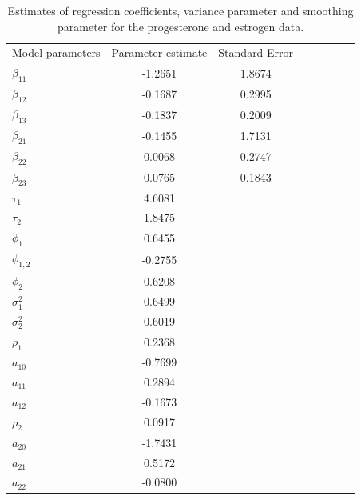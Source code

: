\documentclass[review]{elsarticle}
\begin{document}
\begin{table}[h!]
\centering
\caption{Estimates of regression coefficients, variance parameter and smoothing parameter for the progesterone and estrogen data.} 
\begin{tabular}{l*{6}{c}r}
\hline
\hline
 Model parameters              & Parameter estimate  & Standard Error  
\\
$\beta_{11}$       & -1.2651         & 1.8674          \\
$\beta_{12}$       & -0.1687         & 0.2995          \\
$\beta_{13}$       & -0.1837         & 0.2009          \\
$\beta_{21}$        & -0.1455         & 1.7131          \\
$\beta_{22}$        &  0.0068         & 0.2747          \\
$\beta_{23}$        &  0.0765         & 0.1843          \\
$\tau_1$   &   4.6081      \\
$\tau_2$   &   1.8475      \\
$\phi_1$   &   0.6455      \\
$\phi_{1,2}$   &  -0.2755      \\
$\phi_2$   &   0.6208      \\
$\sigma_1^2$   &   0.6499      \\
$\sigma_2^2$   &   0.6019      \\
$\rho_1$   &   0.2368      \\
$a_{10}$   &  -0.7699      \\
$a_{11}$   &   0.2894      \\
$a_{12}$   &  -0.1673      \\
$\rho_2$   &   0.0917      \\
$a_{20}$   &  -1.7431      \\
$a_{21}$   &   0.5172      \\
$a_{22}$   &  -0.0800      \\
\hline
\end{tabular}
\label{tableLiu}
\end{table}
\end{document}
